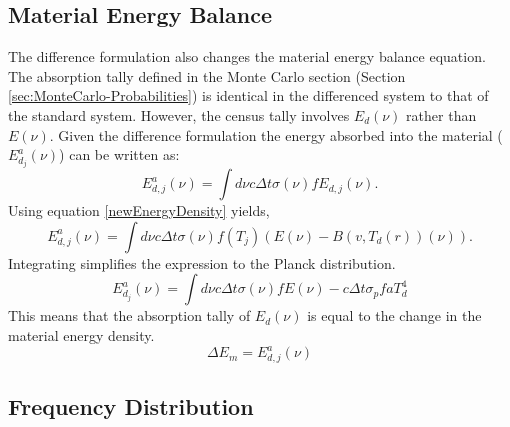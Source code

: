 \subsection{Material Energy Balance}
\label{sec:DifferenceFormulation-Material-Energy-Balance}	

\noindent
	\indent The difference formulation also changes the material energy balance equation. The absorption tally defined in the Monte Carlo section (Section \ref{sec:MonteCarlo-Probabilities}) is identical in the differenced system to that of the standard system. However, the census tally involves $E_d(\nu)$ rather than $E(\nu)$. Given the difference formulation the energy absorbed into the material ($E^a_{d_j}(\nu)$) can be written as:
	\begin{equation}
	 \label{differencedAbsorptionTally}
		E^a_{d,j}(\nu)=\int{d\nu}c\Delta{t}\sigma(\nu){f}E_{d,j}(\nu).
	\end{equation}
	Using equation \ref{newEnergyDensity} yields,
	\begin{equation}
	 \label{newDifferencedAbsorptionTally}
		E^a_{d,j}(\nu)=\int{d\nu}c\Delta{t}\sigma(\nu){f(T_j)}\left(E(\nu)-B{(v,T_{d}(r))}(\nu)\right).
	\end{equation}
	Integrating simplifies the expression to the Planck distribution.
	\begin{equation}
	 \label{newDifferencedAbsorptionTally2}
		E^a_{d_j}(\nu)=\int{d\nu}c\Delta{t}\sigma(\nu){f}E(\nu)-c\Delta{t}\sigma_p{f}aT_d^4
	\end{equation}
	This means that the absorption tally of $E_d(\nu)$ is equal to the change in the material energy density. 
	\begin{equation}
	 \label{newDifferencedAbsorptionTally3}
		\Delta{E_m}=E^a_{d,j}(\nu)
	\end{equation}


\belowSubSecSkip

\subsection{Frequency Distribution}
\label{sec:DifferenceFormulation-Frequency-Distribution}	

